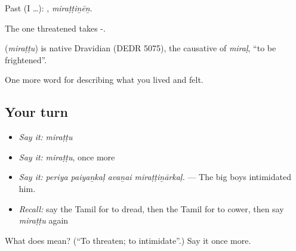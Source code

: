 Past (I …): , \emph{miraṭṭiṉēṉ}.

The one threatened takes -.

\begin{cousinweb}
\textbf{} (\emph{miraṭṭu}) is native Dravidian (DEDR 5075), the causative of  \emph{miraḷ}, \textquotedblleft{}to be frightened\textquotedblright{}.
\end{cousinweb}

\begin{grammarlens}[title={What you've built}]
One more word for describing what you lived and felt.
\end{grammarlens}

\subsection*{Your turn}
\begin{itemize}
\raggedright
  \item \emph{Say it:} \emph{miraṭṭu}
  \item \emph{Say it:} \emph{miraṭṭu}, once more
  \item \emph{Say it:} \emph{periya paiyaṉkaḷ avaṉai miraṭṭiṉārkaḷ.} — The big boys intimidated him.
  \item \emph{Recall:} say the Tamil for to dread, then the Tamil for to cower, then say \emph{miraṭṭu} again
\end{itemize}

\begin{tcolorbox}[breakable,colback=teal!4,colframe=teal!35!black,title={Before you move on}]
What does  mean? (\textquotedblleft{}To threaten; to intimidate\textquotedblright{}.) Say it once more.
\end{tcolorbox}
